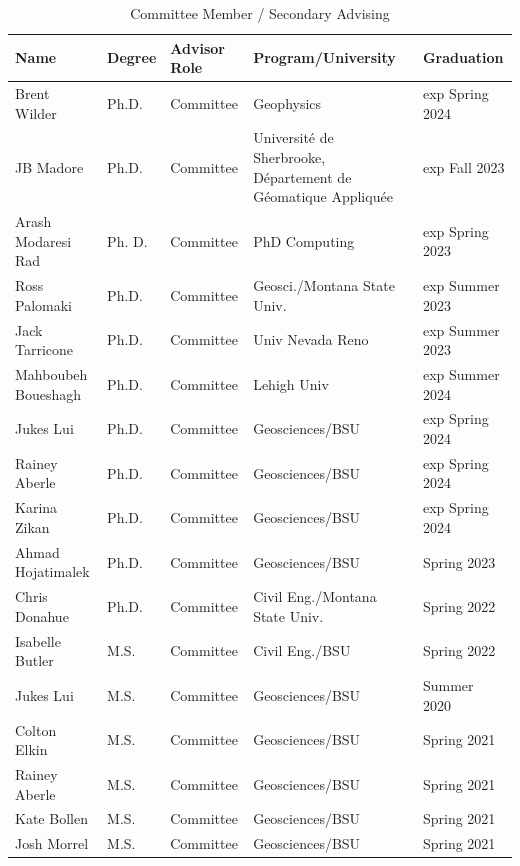 \documentclass[11pt]{article}
\renewcommand\arraystretch{1}
\begin{document}
\begin{table}[!htbp]
\caption*{Committee Member / Secondary Advising}
\tiny
\renewcommand\arraystretch{0.7}
  \centering
  \begin{tabular}{|l|l|l|l|l|}
\hline
\textbf{Name} & \textbf{Degree} & \textbf{Advisor Role} & \textbf{Program/University} & \textbf{Graduation} \\ \hline \hline
Brent Wilder & Ph.D. & Committee & Geophysics & exp Spring 2024 \\ \hline
JB Madore & Ph.D. & Committee & Université de Sherbrooke, Département de Géomatique Appliquée & exp Fall 2023 \\ \hline
Arash Modaresi Rad & Ph. D. & Committee & PhD Computing & exp Spring 2023 \\ \hline
Ross Palomaki & Ph.D. & Committee & Geosci./Montana State Univ. & exp Summer 2023 \\ \hline
Jack Tarricone & Ph.D. & Committee & Univ Nevada Reno & exp Summer 2023 \\ \hline
Mahboubeh Boueshagh & Ph.D. & Committee & Lehigh Univ & exp Summer 2024 \\ \hline
Jukes Lui & Ph.D. & Committee & Geosciences/BSU & exp Spring 2024 \\ \hline
Rainey Aberle & Ph.D. & Committee & Geosciences/BSU & exp Spring 2024 \\ \hline
Karina Zikan & Ph.D. & Committee & Geosciences/BSU & exp Spring 2024 \\ \hline
Ahmad Hojatimalek & Ph.D. & Committee & Geosciences/BSU & Spring 2023 \\ \hline
Chris Donahue & Ph.D. & Committee & Civil Eng./Montana State Univ. & Spring 2022 \\ \hline
Isabelle Butler & M.S. & Committee & Civil Eng./BSU & Spring 2022 \\ \hline
Jukes Lui & M.S. & Committee & Geosciences/BSU & Summer 2020 \\ \hline
Colton Elkin & M.S. & Committee & Geosciences/BSU & Spring 2021 \\ \hline
Rainey Aberle & M.S. & Committee & Geosciences/BSU & Spring 2021 \\ \hline
Kate Bollen & M.S. & Committee & Geosciences/BSU & Spring 2021 \\ \hline
Josh Morrel & M.S. & Committee & Geosciences/BSU & Spring 2021 \\ \hline

\end{tabular}
\end{table}
\end{document}
